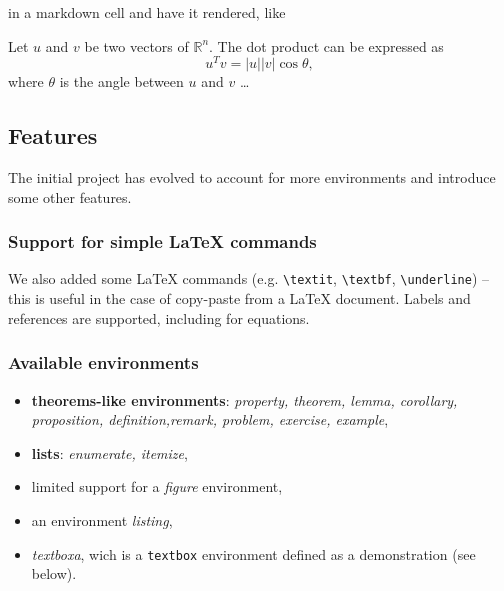 in a markdown cell and have it rendered, like

\begin{theorem}
Let $u$ and $v$ be two vectors of $\mathbb{R}^n$. The dot product can be
expressed as \begin{equation}u^Tv = |u||v| \cos \theta,\end{equation} where $\theta$ is the angle
between $u$ and $v$ \ldots{}
\end{theorem}

    \subsection{Features}\label{features}

    The initial project has evolved to account for more environments and
introduce some other features.

    \subsubsection{Support for simple LaTeX
commands}\label{support-for-simple-latex-commands}

    We also added some LaTeX commands (e.g. \texttt{\textbackslash{}textit},
\texttt{\textbackslash{}textbf}, \texttt{\textbackslash{}underline}) --
this is useful in the case of copy-paste from a LaTeX document. Labels
and references are supported, including for equations.

    \subsubsection{Available environments}\label{available-environments}

    \begin{itemize}
\itemsep1pt\parskip0pt
\item
  \textbf{theorems-like environments}: \emph{property, theorem, lemma,
  corollary, proposition, definition,remark, problem, exercise,
  example},
\item
  \textbf{lists}: \emph{enumerate, itemize},\\
\item
  limited support for a \emph{figure} environment,
\item
  an environment \emph{listing},
\item
  \emph{textboxa}, wich is a \texttt{textbox} environment defined as a
  demonstration (see below).
\end{itemize}

